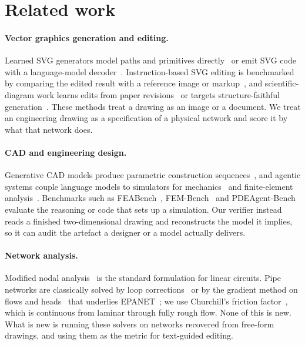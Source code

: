 \section{Related work}
\label{sec:related}

\paragraph{Vector graphics generation and editing.}
Learned SVG generators model paths and primitives directly~\cite{carlier2020deepsvg} or emit SVG code with a
language-model decoder~\cite{rodriguez2025starvector}. Instruction-based SVG editing is benchmarked by
comparing the edited result with a reference image or markup~\cite{svgeditbench}, and scientific-diagram work
learns edits from paper revisions~\cite{scidiagramedit} or targets structure-faithful
generation~\cite{sciforma}. These methods treat a drawing as an image or a document. We treat an engineering
drawing as a specification of a physical network and score it by what that network does.

\paragraph{CAD and engineering design.}
Generative CAD models produce parametric construction sequences~\cite{wu2021deepcad,khan2024text2cad}, and
agentic systems couple language models to simulators for mechanics~\cite{mechagents} and finite-element
analysis~\cite{all_fem,vfeagent}. Benchmarks such as FEABench~\cite{feabench}, FEM-Bench~\cite{fem_bench}
and PDEAgent-Bench~\cite{pdeagent_bench} evaluate the reasoning or code that sets up a simulation. Our
verifier instead reads a finished two-dimensional drawing and reconstructs the model it implies, so it can
audit the artefact a designer or a model actually delivers.

\paragraph{Network analysis.}
Modified nodal analysis~\cite{ho1975mna} is the standard formulation for linear circuits. Pipe networks are
classically solved by loop corrections~\cite{hardycross1936} or by the gradient method on flows and
heads~\cite{todini1988} that underlies EPANET~\cite{rossman2000epanet}; we use Churchill's friction
factor~\cite{churchill1977}, which is continuous from laminar through fully rough flow. None of this is new.
What is new is running these solvers on networks recovered from free-form drawings, and using them as the
metric for text-guided editing.
